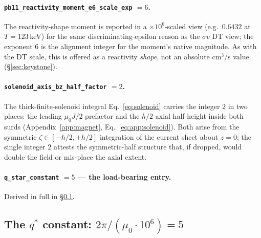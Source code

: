 \paragraph{\texttt{pb11\_reactivity\_moment\_e6\_scale\_exp} $= 6$.}
The reactivity-shape moment is reported in a $\times10^{6}$-scaled view (e.g.\
$0.6432$ at $T=123$\,keV) for the same discriminating-epsilon reason as the
$\sigma v$ DT view; the exponent $6$ is the alignment integer for the
moment's native magnitude. As with the DT scale, this is offered as a
reactivity \emph{shape}, not an absolute cm$^3$/s value
(\S\ref{sec:keystone}).

\paragraph{\texttt{solenoid\_axis\_bz\_half\_factor} $= 2$.}
The thick-finite-solenoid integral Eq.~\eqref{eq:solenoid} carries the integer
$2$ in two places: the leading $\mu_0 J/2$ prefactor and the $h/2$ axial
half-height inside both surds (Appendix~\ref{app:magnet},
Eq.~\eqref{eq:app:solenoid}). Both arise from the symmetric $\zeta\in[-h/2,+h/2]$
integration of the current sheet about $z=0$; the single integer $2$ attests
the symmetric-half structure that, if dropped, would double the field or
mis-place the axial extent.

\paragraph{\texttt{q\_star\_constant} $= 5$ --- the load-bearing entry.}
Derived in full in \S\ref{app:bluemax:qstar}.

\subsection{The $q^{*}$ constant: $2\pi/(\mu_0\!\cdot\!10^{6}) = 5$}
\label{app:bluemax:qstar}

